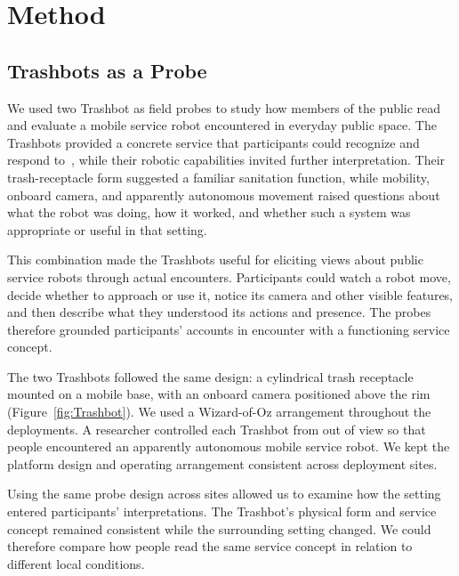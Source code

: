 \section{Method}
\label{sec:method}

\subsection{Trashbots as a Probe}
\label{sec:probe}

We used two Trashbot as field probes to study how members of the public read and evaluate a mobile service robot encountered in everyday public space. The Trashbots provided a concrete service that participants could recognize and respond to~\cite{bu2023trash}, while their robotic capabilities invited further interpretation. Their trash-receptacle form suggested a familiar sanitation function, while mobility, onboard camera, and apparently autonomous movement raised questions about what the robot was doing, how it worked, and whether such a system was appropriate or useful in that setting.

This combination made the Trashbots useful for eliciting views about public service robots through actual encounters. Participants could watch a robot move, decide whether to approach or use it, notice its camera and other visible features, and then describe what they understood its actions and presence. The probes therefore grounded participants' accounts in encounter with a functioning service concept.

The two Trashbots followed the same design: a cylindrical trash receptacle mounted on a mobile base, with an onboard camera positioned above the rim (Figure~\ref{fig:Trashbot}). We used a Wizard-of-Oz arrangement throughout the deployments. A researcher controlled each Trashbot from out of view so that people encountered an apparently autonomous mobile service robot. We kept the platform design and operating arrangement consistent across deployment sites.

Using the same probe design across sites allowed us to examine how the setting entered participants' interpretations. The Trashbot's physical form and service concept remained consistent while the surrounding setting changed. We could therefore compare how people read the same service concept in relation to different local conditions.

